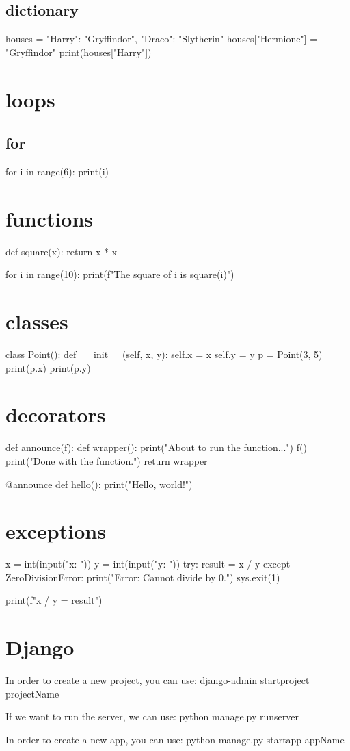\documentclass[12pt]{article}
\begin{document}
\subsection{dictionary}
houses = {"Harry": "Gryffindor", "Draco": "Slytherin"}
houses["Hermione"] = "Gryffindor"
print(houses["Harry"])

\section{loops}
\subsection{for}
for i in range(6):
    print(i)

\section{functions}
def square(x):
    return x * x

for i in range(10):
    print(f"The square of {i} is {square(i)}")

\section{classes}
class Point():
    def __init__(self, x, y):
        self.x = x
        self.y = y
p = Point(3, 5)
print(p.x)
print(p.y)

\section{decorators}
def announce(f):
    def wrapper():
        print("About to run the function...")
        f()
        print("Done with the function.")
    return wrapper

@announce
def hello():
    print("Hello, world!")

\section{exceptions}
x = int(input("x: "))
y = int(input("y: "))
try:
    result = x / y
except ZeroDivisionError:
    print("Error: Cannot divide by 0.")
    sys.exit(1)

print(f"{x} / {y} = {result}")


\section{Django}
In order to create a new project, you can use:
django-admin startproject projectName

If we want to run the server, we can use:
python manage.py runserver

In order to create a new app, you can use:
python manage.py startapp appName
\end{document}
